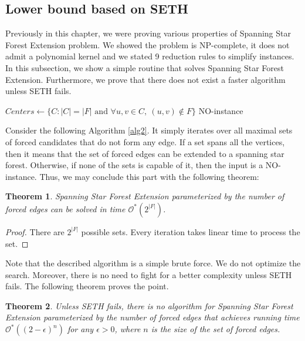 \documentclass[en]{pracamgr}
\newtheorem{theorem}{Theorem}
\newcommand{\ssf}{spanning star forest}
\newcommand{\ssfep}{{\sc Spanning Star Forest Extension}}
\begin{document}
\subsection{Lower bound based on SETH}

Previously in this chapter, we were proving various properties of \ssfep{} problem. We showed the problem is NP-complete, it does not admit a polynomial kernel and we stated 9 reduction rules to simplify instances. In this subsection, we show a simple routine that solves \ssfep{}. Furthermore, we prove that there does not exist a faster algorithm unless SETH fails.

\begin{algorithm}\label{alg2}
	\KwResult{\ssf{} of $G$ extending $F$}
	$Centers \leftarrow \{C: |C|=|F| \text{ and } \forall u,v \in C,\ (u,v) \notin F\}$\;
	\Return NO-instance\;
	\caption{Extending a spanning star forest from a reduced graph.}
\end{algorithm}

Consider the following Algorithm \ref{alg2}. It simply iterates over all maximal sets of forced candidates that do not form any edge. If a set spans all the vertices, then it means that the set of forced edges can be extended to a spanning star forest. Otherwise, if none of the sets is capable of it, then the input is a NO-instance. Thus, we may conclude this part with the following theorem:

\begin{theorem}
	\ssfep{} parameterized by the number of forced edges can be solved in time $\mathcal{O}^*(2^{|F|})$.
\end{theorem}

\begin{proof}
	There are $2^{|F|}$ possible sets. Every iteration takes linear time to process the set.
\end{proof}

Note that the described algorithm is a simple brute force. We do not optimize the search. Moreover, there is no need to fight for a better complexity unless SETH fails. The following theorem proves the point.

\begin{theorem}
	Unless SETH fails, there is no algorithm for \ssfep{} parameterized by the number of forced edges that achieves running time $\mathcal{O}^*((2-\epsilon)^n)$ for any $\epsilon > 0$, where $n$ is the size of the set of forced edges.
\end{theorem}
\end{document}

